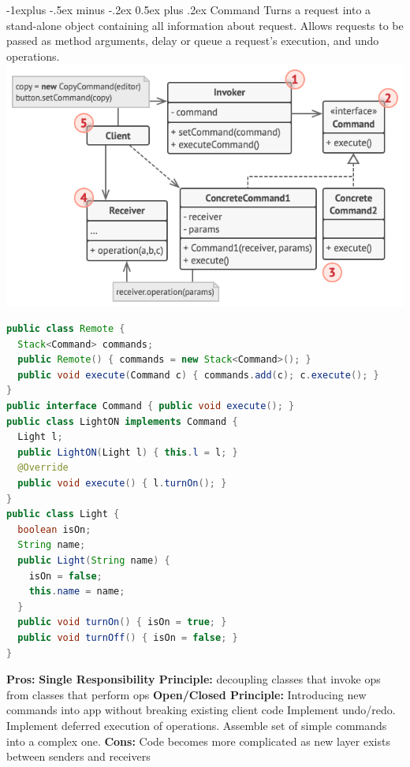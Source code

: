\documentclass[letterpaper, 8pt]{extarticle}
\makeatletter
\renewcommand{\subsection}{\@startsection{subsection}{2}{0mm}%
                                {-1explus -.5ex minus -.2ex}%
                                {0.5ex plus .2ex}%
                                {\normalfont\small\bfseries}}
\makeatother
\begin{document}
\begin{multicols*}{5}
  \subsection{Command}
  Turns a request into a stand-alone object containing all information about request.
  Allows requests to be passed as method arguments, delay or queue a request's execution, and undo operations.
  \includegraphics[width=\linewidth]{command.png}
    \begin{lstlisting}[language=Java, breaklines=true]
public class Remote {
  Stack<Command> commands;
  public Remote() { commands = new Stack<Command>(); }
  public void execute(Command c) { commands.add(c); c.execute(); } 
}
public interface Command { public void execute(); }
public class LightON implements Command {
  Light l;
  public LightON(Light l) { this.l = l; }
  @Override
  public void execute() { l.turnOn(); }
}
public class Light {
  boolean isOn;
  String name;
  public Light(String name) {
    isOn = false;
    this.name = name;
  }
  public void turnOn() { isOn = true; }
  public void turnOff() { isOn = false; }
}
    \end{lstlisting}
  \textbf{Pros:} \textbf{Single Responsibility Principle:} decoupling classes that invoke ops from classes that perform ops
  \textbf{Open/Closed Principle:} Introducing new commands into app without breaking existing client code
  Implement undo/redo.
  Implement deferred execution of operations.
  Assemble set of simple commands into a complex one.
  \textbf{Cons:} Code becomes more complicated as new layer exists between senders and receivers


\end{multicols*}
\end{document}
